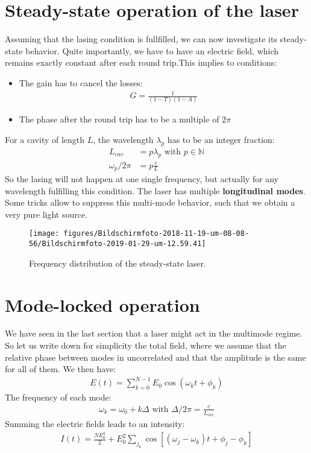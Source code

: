 \documentclass[10pt]{article}
\begin{document}
\section{Steady-state operation of the laser}
Assuming that the lasing condition is fullfilled, we can now investigate its steady-state behavior. Quite importantly, we have to have an electric field, which remains exactly constant after each round trip.This implies to conditions:
\begin{itemize}
\item The gain has to cancel the losses:
\begin{align}
G = \frac{1}{(1-T)(1-A)}
\end{align}
\item The phase after the round trip has to be a multiple of $2\pi$
\end{itemize}
For a cavity of length $L$, the wavelength  $\lambda_p$ has to be an integer fraction:
\begin{align}
L_{cav} &= p\lambda_p\text{ with }p \in  \mathbb{N}\\
\omega_p/2\pi &=p \frac{c}{L} 
\end{align}
So the lasing will not happen at one single frequency, but actually for any wavelength fulfilling this condition. The laser has multiple \textbf{longitudinal modes}. Some tricks allow to suppress this multi-mode behavior, such that we obtain a very pure light source.
\begin{figure}[h!]
\begin{center}
\texttt{[image: figures/Bildschirmfoto-2018-11-19-um-08-08-56/Bildschirmfoto-2019-01-29-um-12.59.41]}
\caption{{Frequency distribution of the steady-state laser.
{\label{659829}}%
}}
\end{center}
\end{figure}

\section{Mode-locked operation}

We have seen in the last section that a laser might act in the multimode regime. So let us write down for simplicity the total field, where we assume that the relative phase between modes in uncorrelated and that the amplitude is the same for all of them. We then have:
\begin{align}
E(t) = \sum_{k=0}^{N-1}E_0 \cos(\omega_k t +\phi_k)
\end{align}
The frequency of each mode:
\begin{align}
\omega_k = \omega_0 + k \Delta\text{ with }\Delta/2\pi = \frac{c}{L_{cav}}
\end{align}
Summing the electric fields leads to an intensity:
\begin{align}
I(t)= \frac{NE_0^2}{2}+E_0^2\sum_{j_k}\cos\left[(\omega_j-\omega_k)t+\phi_j-\phi_k\right]
\end{align}
\end{document}
